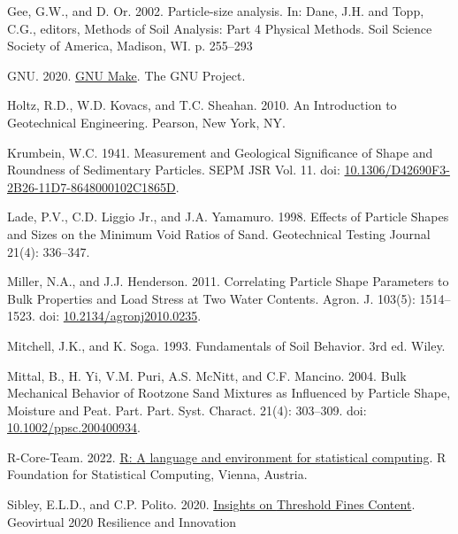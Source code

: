 \documentclass[
  letterpaper,
]{article}
\newlength{\cslhangindent}
\newlength{\cslentryspacingunit} %
\newenvironment{CSLReferences}[2] %
 {%
  \setlength{\parindent}{0pt}
  \ifodd #1
  \let\oldpar\par
  \def\par{\hangindent=\cslhangindent\oldpar}
  \fi
  \setlength{\parskip}{#2\cslentryspacingunit}
 }%
 {}
\begin{document}
\begin{CSLReferences}{1}{0}
\leavevmode{}%
Gee, G.W., and D. Or. 2002. Particle-size analysis. In: Dane, J.H. and Topp, C.G., editors, Methods of {Soil Analysis}: {Part} 4 {Physical Methods}. {Soil Science Society of America}, {Madison, WI}. p. 255--293

\leavevmode{}%
GNU. 2020. \href{https://www.gnu.org/software/make/}{{GNU Make}}. {The GNU Project}.

\leavevmode{}%
Holtz, R.D., W.D. Kovacs, and T.C. Sheahan. 2010. An {Introduction} to {Geotechnical Engineering}. {Pearson}, {New York, NY}.

\leavevmode{}%
Krumbein, W.C. 1941. Measurement and {Geological Significance} of {Shape} and {Roundness} of {Sedimentary Particles}. SEPM JSR Vol. 11. doi: \href{https://doi.org/10.1306/D42690F3-2B26-11D7-8648000102C1865D}{10.1306/D42690F3-2B26-11D7-8648000102C1865D}.

\leavevmode{}%
Lade, P.V., C.D. Liggio Jr., and J.A. Yamamuro. 1998. Effects of {Particle Shapes} and {Sizes} on the {Minimum Void Ratios} of {Sand}. Geotechnical Testing Journal 21(4): 336--347.

\leavevmode{}%
Miller, N.A., and J.J. Henderson. 2011. Correlating {Particle Shape Parameters} to {Bulk Properties} and {Load Stress} at {Two Water Contents}. Agron. J. 103(5): 1514--1523. doi: \href{https://doi.org/10.2134/agronj2010.0235}{10.2134/agronj2010.0235}.

\leavevmode{}%
Mitchell, J.K., and K. Soga. 1993. Fundamentals of {Soil Behavior}. 3rd ed. {Wiley}.

\leavevmode{}%
Mittal, B., H. Yi, V.M. Puri, A.S. McNitt, and C.F. Mancino. 2004. Bulk {Mechanical Behavior} of {Rootzone Sand Mixtures} as {Influenced} by {Particle Shape}, {Moisture} and {Peat}. Part. Part. Syst. Charact. 21(4): 303--309. doi: \href{https://doi.org/10.1002/ppsc.200400934}{10.1002/ppsc.200400934}.

\leavevmode{}%
R-Core-Team. 2022. \href{https://www.r-project.org/}{R: {A} language and environment for statistical computing}. {R Foundation for Statistical Computing}, {Vienna, Austria}.

\leavevmode{}%
Sibley, E.L.D., and C.P. Polito. 2020. \href{https://geovirtual2020.ca/wp-content/files/406.pdf}{Insights on {Threshold Fines Content}}. Geovirtual 2020 {Resilience} and {Innovation}


\end{CSLReferences}
\end{document}
